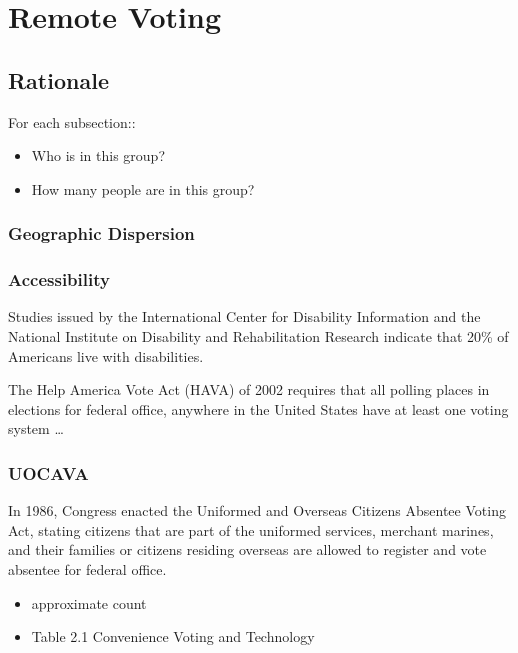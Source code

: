 \chapter{Remote Voting}
\label{chapter:remote_voting}

\section{Rationale}

For each subsection::
\begin{itemize}
\item Who is in this group?
\item How many people are in this group?
\end{itemize}

\subsection{Geographic Dispersion}

\subsection{Accessibility}
Studies issued by the International Center for Disability Information and the National Institute on Disability and Rehabilitation Research indicate that 20\% of Americans live with disabilities. 

The Help America Vote Act (HAVA) of 2002 requires that all polling places in elections for federal office, anywhere in the United States have at least one voting system  \ldots


\subsection{UOCAVA}
In 1986, Congress enacted the Uniformed and Overseas Citizens Absentee Voting Act, stating citizens that are part of the uniformed services, merchant marines, and their families or citizens residing overseas are allowed to register and vote absentee for federal office.

\begin{itemize}
\item approximate count
\item Table 2.1 Convenience Voting and Technology
\end{itemize}

